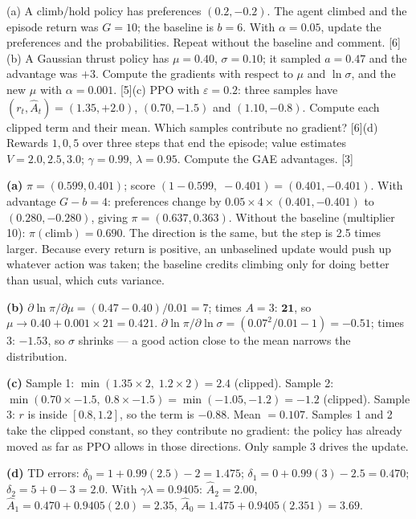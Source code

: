 \documentclass[11pt]{article}
\begin{document}
\begin{prob}(a) A climb/hold policy has preferences $(0.2,-0.2)$. The agent climbed and the episode return was $G=10$; the baseline is $b=6$. With $\alpha=0.05$, update the preferences and the probabilities. Repeat without the baseline and comment. [6]\newline (b) A Gaussian thrust policy has $\mu=0.40$, $\sigma=0.10$; it sampled $a=0.47$ and the advantage was $+3$. Compute the gradients with respect to $\mu$ and $\ln\sigma$, and the new $\mu$ with $\alpha=0.001$. [5]\newline (c) PPO with $\varepsilon=0.2$: three samples have $(r_t,\hat A_t)=(1.35,+2.0)$, $(0.70,-1.5)$ and $(1.10,-0.8)$. Compute each clipped term and their mean. Which samples contribute no gradient? [6]\newline (d) Rewards $1,0,5$ over three steps that end the episode; value estimates $V=2.0,2.5,3.0$; $\gamma=0.99$, $\lambda=0.95$. Compute the GAE advantages. [3]\end{prob}

\begin{soln}\textbf{(a)} $\pi=(0.599,0.401)$; score $(1-0.599,\;-0.401)=(0.401,-0.401)$. With advantage $G-b=4$: preferences change by $0.05\times4\times(0.401,-0.401)$ to $(0.280,-0.280)$, giving $\pi=(\mathbf{0.637},0.363)$. Without the baseline (multiplier 10): $\pi(\text{climb})=0.690$. The direction is the same, but the step is 2.5 times larger. Because every return is positive, an unbaselined update would push up whatever action was taken; the baseline credits climbing only for doing better than usual, which cuts variance.

\textbf{(b)} $\partial\ln\pi/\partial\mu=(0.47-0.40)/0.01=7$; times $A=3$: $\mathbf{21}$, so $\mu\to0.40+0.001\times21=\mathbf{0.421}$. $\partial\ln\pi/\partial\ln\sigma=(0.07^2/0.01-1)=-0.51$; times 3: $\mathbf{-1.53}$, so $\sigma$ shrinks --- a good action close to the mean narrows the distribution.

\textbf{(c)} Sample 1: $\min(1.35\times2,\;1.2\times2)=\mathbf{2.4}$ (clipped). Sample 2: $\min(0.70\times-1.5,\;0.8\times-1.5)=\min(-1.05,-1.2)=\mathbf{-1.2}$ (clipped). Sample 3: $r$ is inside $[0.8,1.2]$, so the term is $\mathbf{-0.88}$. Mean $=\mathbf{0.107}$. Samples 1 and 2 take the clipped constant, so they contribute no gradient: the policy has already moved as far as PPO allows in those directions. Only sample 3 drives the update.

\textbf{(d)} TD errors: $\delta_0=1+0.99(2.5)-2=1.475$; $\delta_1=0+0.99(3)-2.5=0.470$; $\delta_2=5+0-3=2.0$. With $\gamma\lambda=0.9405$: $\hat A_2=\mathbf{2.00}$, $\hat A_1=0.470+0.9405(2.0)=\mathbf{2.35}$, $\hat A_0=1.475+0.9405(2.351)=\mathbf{3.69}$.\end{soln}
\end{document}
